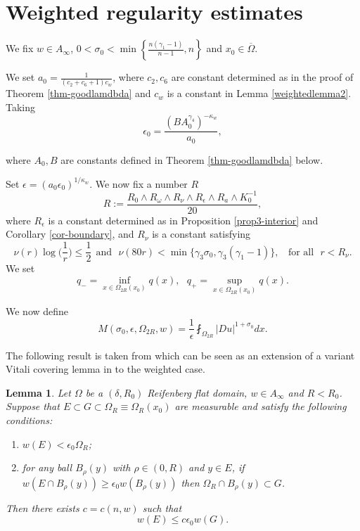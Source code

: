 \documentclass[a4paper,10pt]{amsart}
\newtheorem{lem}[thm]{Lemma}
\newcommand{\f}{\frac}
\newcommand{\om}{\omega}
\newcommand{\Om}{\Omega}
\newcommand{\vc}{\infty}
\begin{document}
\section{Weighted regularity estimates}
We fix $w\in A_\vc$, $0<\sigma_0<\min\left\{\f{n(\gamma_1-1)}{n-1},n\right\}$ and $x_0\in \overline{\Om}$. 

We set $a_0=\f{1}{(c_2+c_6+1)c_w}$, where $c_2, c_6$ are constant determined as in the proof of Theorem \ref{thm-goodlamdbda} and $c_w$ is a constant in Lemma \ref{weightedlemma2}. Taking 
\begin{equation}
\label{eq-epsilon0}
\epsilon_0=\f{(BA_0^{\gamma_4})^{-\kappa_w}}{a_0},
\end{equation}

where $A_0, B$ are constants defined in Theorem \ref{thm-goodlamdbda} below.

Set $\epsilon=(a_0 \epsilon_0)^{1/\kappa_w}$. We now fix a number $R$
\begin{equation}\label{eq-defn R}
R:= \f{R_0\wedge R_\om\wedge R_{\nu}\wedge R_{\epsilon} \wedge R_a\wedge K_0^{-1}}{20},
\end{equation}
where $R_\epsilon$ is a constant determined as in Proposition \ref{prop3-interior} and Corollary \ref{cor-boundary}, and $R_\nu$ is a constant satisfying
\begin{equation}\label{eq-rnu}
\nu(r)\log\Big(\f{1}{r}\Big)\leq \f{1}{2} \ \ \text{and} \ \ \  \nu(80r)<\min\{\gamma_3\sigma_0,\gamma_3(\gamma_1-1)\}, \ \ \ \ \text{for all} \ \ \ r<R_\nu.
\end{equation}
We set 
$$
q_-=\inf_{x\in \Om_{2R}(x_0)}q(x), \ \ \ q_+=\sup_{x\in \Om_{2R}(x_0)}q(x).
$$

We now define
\begin{equation}\label{defn-M epsilon}
M(\sigma_0,\epsilon,\Om_{2R},w)=\f{1}{\epsilon}\fint_{\Om_{2R}}|Du|^{1+\sigma_0} dx.
\end{equation}

	The following result is taken from \cite{MP} which can be seen as an extension of a variant Vitali covering lemma in \cite{CP} to the weighted case.	
\begin{lem}\label{lem2-proofmainresutls}
	Let $\Om$ be a $(\delta, R_0)$ Reifenberg flat domain, $w\in A_\vc$ and $R<R_0$. Suppose that $E\subset G\subset \Om_{R}\equiv \Om_{R}(x_0)$ are measurable and satisfy the following conditions:
	\begin{enumerate}[{\rm (a)}]
		\item $w(E)< \epsilon_0 
		\Om_{R}$;
		\item for any ball $B_\rho(y)$ with $\rho\in (0,R)$ and $y\in E$, if $w(E\cap B_\rho(y))\geq \epsilon_0 w(B_\rho(y))$ then $\Om_{R}\cap B_\rho(y)\subset G$.
	\end{enumerate}
	Then there exists $c=c(n,w)$  such that
	$$
	w(E)\leq c\epsilon_0 w(G).
	$$
\end{lem}
\end{document}
